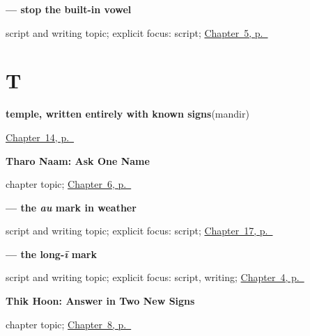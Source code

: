 \noindent\begin{minipage}[t]{\linewidth}
\raggedright
\textbf{ — stop the built-in vowel}\par
\footnotesize script and writing topic; explicit focus: script; \hyperref[ch:mw-name-answer]{Chapter~5, p.~\pageref*{ch:mw-name-answer}}
\end{minipage}\par\smallskip

\section*{T}

\noindent\begin{minipage}[t]{\linewidth}
\raggedright
\textbf{temple, written entirely with known signs}\enspace\emph{}\enspace(mandir)\par
\footnotesize \hyperref[ch:mw-places-three]{Chapter~14, p.~\pageref*{ch:mw-places-three}}
\end{minipage}\par\smallskip

\noindent\begin{minipage}[t]{\linewidth}
\raggedright
\textbf{Tharo Naam: Ask One Name}\par
\footnotesize chapter topic; \hyperref[ch:mw-name-question]{Chapter~6, p.~\pageref*{ch:mw-name-question}}
\end{minipage}\par\smallskip

\noindent\begin{minipage}[t]{\linewidth}
\raggedright
\textbf{ — the \emph{au} mark in weather}\par
\footnotesize script and writing topic; explicit focus: script; \hyperref[ch:mw-weather-six]{Chapter~17, p.~\pageref*{ch:mw-weather-six}}
\end{minipage}\par\smallskip

\noindent\begin{minipage}[t]{\linewidth}
\raggedright
\textbf{ — the long-\emph{ī} mark}\par
\footnotesize script and writing topic; explicit focus: script, writing; \hyperref[ch:mw-paani]{Chapter~4, p.~\pageref*{ch:mw-paani}}
\end{minipage}\par\smallskip

\noindent\begin{minipage}[t]{\linewidth}
\raggedright
\textbf{Thik Hoon: Answer in Two New Signs}\par
\footnotesize chapter topic; \hyperref[ch:mw-wellbeing-answer]{Chapter~8, p.~\pageref*{ch:mw-wellbeing-answer}}
\end{minipage}\par\smallskip

